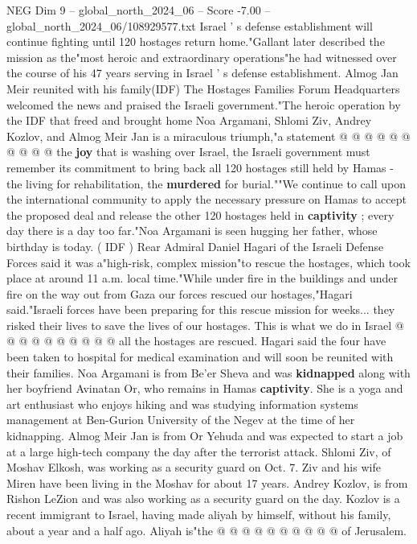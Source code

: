 \begin{textsample}{NEG Dim 9 – global\_north\_2024\_06 – Score -7.00 – global\_north\_2024\_06/108929577.txt}
Israel ' s defense establishment will continue fighting until 120 hostages return home."Gallant later described the mission as the"most heroic and extraordinary operations"he had witnessed over the course of his 47 years serving in Israel ' s defense establishment.
Almog Jan Meir reunited with his family(IDF) The Hostages Families Forum Headquarters welcomed the news and praised the Israeli government."The heroic operation by the IDF that freed and brought home Noa Argamani, Shlomi Ziv, Andrey Kozlov, and Almog Meir Jan is a miraculous triumph,"a statement @ @ @ @ @ @ @ @ @ @ the \textbf{joy} that is washing over Israel, the Israeli government must remember its commitment to bring back all 120 hostages still held by Hamas - the living for rehabilitation, the \textbf{murdered} for burial.""We continue to call upon the international community to apply the necessary pressure on Hamas to accept the proposed deal and release the other 120 hostages held in \textbf{captivity} ; every day there is a day too far."Noa Argamani is seen hugging her father, whose birthday is today. ( IDF ) Rear Admiral Daniel Hagari of the Israeli Defense Forces said it was a"high-risk, complex mission"to rescue the hostages, which took place at around 11 a.m. local time."While under fire in the buildings and under fire on the way out from Gaza our forces rescued our hostages,"Hagari said."Israeli forces have been preparing for this rescue mission for weeks... they risked their lives to save the lives of our hostages.
This is what we do in Israel @ @ @ @ @ @ @ @ @ @ all the hostages are rescued.
Hagari said the four have been taken to hospital for medical examination and will soon be reunited with their families.
Noa Argamani is from Be'er Sheva and was \textbf{kidnapped} along with her boyfriend Avinatan Or, who remains in Hamas \textbf{captivity}.
She is a yoga and art enthusiast who enjoys hiking and was studying information systems management at Ben-Gurion University of the Negev at the time of her kidnapping.
Almog Meir Jan is from Or Yehuda and was expected to start a job at a large high-tech company the day after the terrorist attack.
Shlomi Ziv, of Moshav Elkosh, was working as a security guard on Oct. 7.
Ziv and his wife Miren have been living in the Moshav for about 17 years.
Andrey Kozlov, is from Rishon LeZion and was also working as a security guard on the day.
Kozlov is a recent immigrant to Israel, having made aliyah by himself, without his family, about a year and a half ago.
Aliyah is"the @ @ @ @ @ @ @ @ @ @ of Jerusalem.

\end{textsample}
